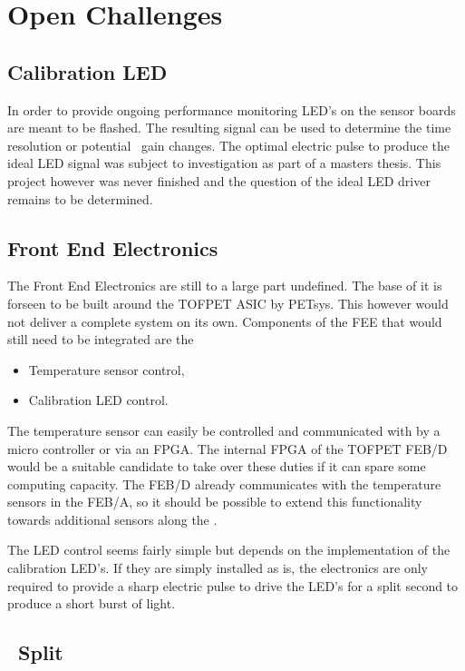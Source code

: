 \documentclass[../BTOF_summary.tex]{subfiles}
\begin{document}
\section{Open Challenges}


\subsection{Calibration LED}

In order to provide ongoing performance monitoring LED's on the sensor boards are meant to be flashed.
The resulting signal can be used to determine the time resolution or potential \sipm\ gain changes.
The optimal electric pulse to produce the ideal LED signal was subject to investigation as part of a masters thesis.
This project however was never finished and the question of the ideal LED driver remains to be determined.

\subsection{Front End Electronics}

The Front End Electronics are still to a large part undefined.
The base of it is forseen to be built around the TOFPET ASIC by PETsys.
This however would not deliver a complete system on its own.
Components of the FEE that would still need to be integrated are the 
\begin{itemize}
    \item Temperature sensor control,
    \item Calibration LED control.
\end{itemize}

The temperature sensor can easily be controlled and communicated with by a micro controller or via an FPGA.
The internal FPGA of the TOFPET FEB/D would be a suitable candidate to take over these duties if it can spare some computing capacity.
The FEB/D already communicates with the temperature sensors in the FEB/A, so it should be possible to extend this functionality towards additional sensors along the \railboard .

The LED control seems fairly simple but depends on the implementation of the calibration LED's.
If they are simply installed as is, the electronics are only required to provide a sharp electric pulse to drive the LED's for a split second to produce a short burst of light.

\subsection[]{\railboard\ Split}
\end{document}
